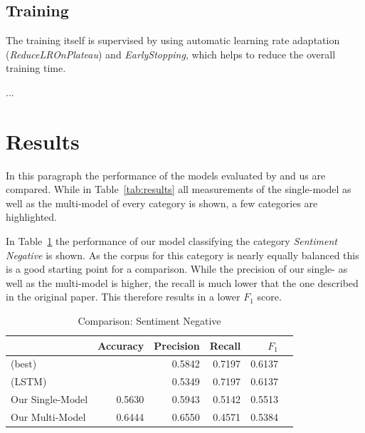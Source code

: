 \documentclass[11pt,a4paper]{article}
\begin{document}
\subsection{Training}

The training itself is supervised by using automatic learning rate adaptation (\textit{ReduceLROnPlateau}) and \textit{EarlyStopping}, which helps to reduce the overall training time.

...


\section{Results}
In this paragraph the performance of the models evaluated by  and us are compared.
While in Table~\ref{tab:results} all measurements of the single-model as well as the multi-model of every category is shown, a few categories are highlighted.

In Table~\ref{tab:results:sentiment_negative} the performance of our model classifying the category \textit{Sentiment Negative} is shown. As the corpus for this category is nearly equally balanced this is a good starting point for a comparison. While the precision of our single- as well as the multi-model is higher, the recall is much lower that the one described in the original paper. This therefore results in a lower $F_1$ score.
\begin{table}[h!]
	\centering\tiny
	\begin{tabular}{l r r r r r}
		& Accuracy & Precision & Recall & $F_1$ \\
		\hline
		\cite{Schabus17} (best) & & 0.5842 & 0.7197 & 0.6137 \\
		\cite{Schabus17} (LSTM) & & 0.5349 & 0.7197 & 0.6137 \\
		\hline
		Our Single-Model & 0.5630 & 0.5943 & 0.5142 & 0.5513\\
		Our Multi-Model & 0.6444 & 0.6550 & 0.4571 & 0.5384 \\
	\end{tabular}  
	\caption{Comparison: Sentiment Negative}
	\label{tab:results:sentiment_negative}
\end{table}
\end{document}
